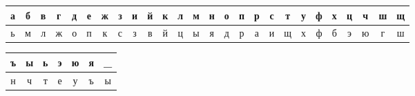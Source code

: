 \documentclass[a4paper,14pt]{extarticle}
\begin{document}
    \begin{center}
        \begin{tabular}{|c|c|c|c|c|c|c|c|c|c|c|c|c|c|c|c|c|c|c|c|c|c|c|c|c|c|}
            \hline
            а & б & в & г & д & е & ж & з & и & й & к & л & м & н & о & п & р & с & т & у & ф & х & ц & ч & ш & щ  \\
            \hline
            ь & м & л & ж & о & п & к & с & з & в & й & ц & ы & я & д & р & а & и & щ & х & ф & б & э & ю & г & ш   \\
            \hline
        \end{tabular}

    \end{center}
    \begin{tabular}{|c|c|c|c|c|c|c|}
        \hline
        ъ & ы & ь & э & ю & я & \_ \\
        \hline
        н & ч & т & е & у & ъ & ы \\
        \hline
    \end{tabular}\\
\end{document}
